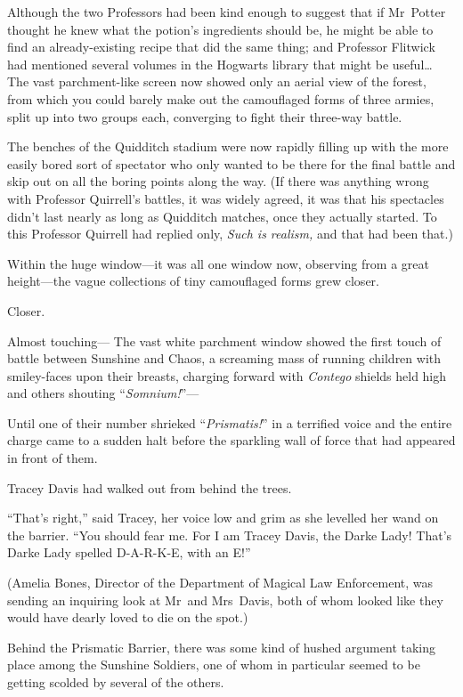Although the two Professors had been kind enough to suggest that if Mr~Potter
thought he knew what the potion’s ingredients should be, he might be able to
find an already-existing recipe that did the same thing; and Professor Flitwick
had mentioned several volumes in the Hogwarts library that might be
useful…
\later
The vast parchment-like screen now showed only an aerial view of the forest,
from which you could barely make out the camouflaged forms of three armies,
split up into two groups each, converging to fight their three-way battle.

The benches of the Quidditch stadium were now rapidly filling up with the more
easily bored sort of spectator who only wanted to be there for the final battle
and skip out on all the boring points along the way. (If there was anything
wrong with Professor Quirrell’s battles, it was widely agreed, it was that his
spectacles didn’t last nearly as long as Quidditch matches, once they actually
started. To this Professor Quirrell had replied only, \emph{Such is realism,}
and that had been that.)

Within the huge window—it was all one window now, observing from a great
height—the vague collections of tiny camouflaged forms grew closer.

Closer.

Almost touching—
\later
The vast white parchment window showed the first touch of battle between
Sunshine and Chaos, a screaming mass of running children with smiley-faces upon
their breasts, charging forward with \emph{Contego} shields held high and
others shouting “\emph{Somnium!}”—

Until one of their number shrieked “\emph{Prismatis!}” in a terrified voice and
the entire charge came to a sudden halt before the sparkling wall of force that
had appeared in front of them.

Tracey Davis had walked out from behind the trees.

“That’s right,” said Tracey, her voice low and grim as she levelled her wand on
the barrier. “You should fear me. For I am Tracey Davis, the Darke Lady! That’s
Darke Lady spelled D-A-R-K-E, with an E!”

(Amelia Bones, Director of the Department of Magical Law Enforcement, was
sending an inquiring look at Mr~and Mrs~Davis, both of whom looked like they
would have dearly loved to die on the spot.)

Behind the Prismatic Barrier, there was some kind of hushed argument taking
place among the Sunshine Soldiers, one of whom in particular seemed to be
getting scolded by several of the others.

